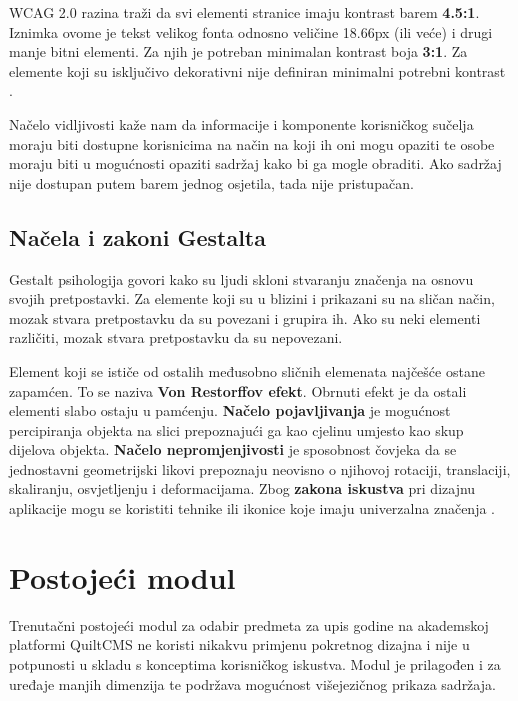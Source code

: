 \documentclass[times, utf8, zavrsni, numeric]{fer}
\begin{document}
    WCAG 2.0 razina traži da svi elementi stranice imaju kontrast barem \textbf{4.5:1}. Iznimka ovome je tekst velikog fonta odnosno veličine 18.66px (ili veće) i drugi manje bitni elementi. Za njih je potreban minimalan kontrast boja \textbf{3:1}. Za elemente koji su isključivo dekorativni nije definiran minimalni potrebni kontrast \cite{contrast}.
    
    Načelo vidljivosti kaže nam da informacije i komponente korisničkog sučelja moraju biti dostupne korisnicima na način na koji ih oni mogu opaziti te osobe moraju biti u mogućnosti opaziti sadržaj kako bi ga mogle obraditi. Ako sadržaj nije dostupan putem barem jednog osjetila, tada nije pristupačan.

    \section{Načela i zakoni Gestalta}
    Gestalt psihologija govori kako su ljudi skloni stvaranju značenja na osnovu svojih pretpostavki. Za elemente koji su u blizini i prikazani su na sličan način, mozak stvara pretpostavku da su povezani i grupira ih. Ako su neki elementi različiti, mozak stvara pretpostavku da su nepovezani.
    
    Element koji se ističe od ostalih međusobno sličnih elemenata najčešće ostane zapamćen. To se naziva \textbf{Von Restorffov efekt}. Obrnuti efekt je da ostali elementi slabo ostaju u pamćenju. \textbf{Načelo pojavljivanja} je mogućnost percipiranja objekta na slici prepoznajući ga kao cjelinu umjesto kao skup dijelova objekta. \textbf{Načelo nepromjenjivosti} je sposobnost čovjeka da se jednostavni geometrijski likovi prepoznaju neovisno o njihovoj rotaciji, translaciji, skaliranju, osvjetljenju i deformacijama. Zbog \textbf{zakona iskustva} pri dizajnu aplikacije mogu se koristiti tehnike ili ikonice koje imaju univerzalna značenja \cite{gestalt}. 


\chapter{Postojeći modul}
Trenutačni postojeći modul za odabir predmeta za upis godine na akademskoj platformi QuiltCMS ne koristi nikakvu primjenu pokretnog dizajna i nije u potpunosti u skladu s konceptima korisničkog iskustva. Modul je prilagođen i za uređaje manjih dimenzija te podržava mogućnost višejezičnog prikaza sadržaja.
\end{document}
